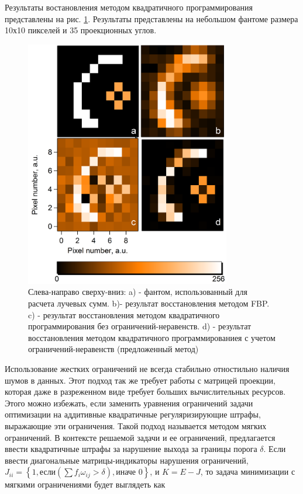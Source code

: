 Результаты востановления методом квадратичного программирования представлены на рис. \ref{im:quadprog}.
Результаты представлены на небольшом фантоме размера 10х10 пикселей и 35 проекционных углов.

\begin{figure}
  \centering
  \includegraphics[width=0.8\textwidth]{Dissertation/images/part2_img/quadprog}
  \caption{Слева-направо сверху-вниз: a) - фантом, использованный для расчета лучевых сумм. b)- результат восстановления методом FBP. c) - результат восстановления методом квадратичного программирования без ограничений-неравенств. d) - результат восстановления методом квадратичного программированиея с учетом ограничений-неравенств (предложенный метод)}
  \label{im:quadprog}
\end{figure}

Использование жестких ограничений не всегда стабильно отностильно наличия шумов в данных.
Этот подход так же требует работы с матрицей проекции, которая даже в разреженном виде требует больших вычислительных ресурсов.
Этого можно избежать, если заменить уравнения ограничений задачи оптимизации на аддитивные квадратичные регуляризирующие штрафы, выражающие эти ограничения.
Такой подход называется методом мягких ограничений.
В контексте решаемой задачи и ее ограничений, предлагается ввести квадратичные штрафы за нарушение выхода за границы порога $\delta$.
Если ввести диагональные матрицы-индикаторы нарушения ограничений, $J_{ii} = \left\{1, \mbox{если} \left(\sum f_{i} \omega_{ij} > \delta \right), \mbox{иначе } 0\right\}$, и $K = E - J$, то задача минимизации с мягкими ограничениями будет выглядеть как

